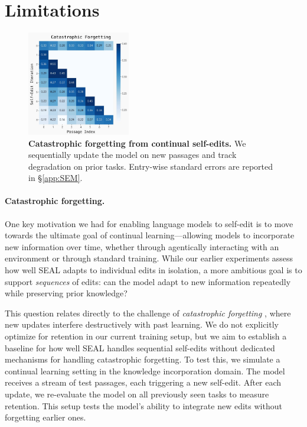 \documentclass{article}
\newcommand{\methodacronym}{SEAL\xspace}
\begin{document}
\section{Limitations}
\begin{figure}
    \vspace{-15pt}
    \centering
    \includegraphics[width=0.4\textwidth]{figures/catastrophic.pdf}
    \vspace{-10pt}
    \caption{\textbf{Catastrophic forgetting from continual self-edits.} We sequentially update the model on new passages and track degradation on prior tasks. Entry-wise standard errors are reported in \S\ref{app:SEM}.}
    \label{fig:forgetting_analysis}
    \vspace{-25pt}
\end{figure}

\paragraph{Catastrophic forgetting.} One key motivation we had for enabling language models to self-edit is to move towards the ultimate goal of continual learning---allowing models to incorporate new information over time, whether through agentically interacting with an environment or through standard training. While our earlier experiments assess how well \methodacronym adapts to individual edits in isolation, a more ambitious goal is to support \textit{sequences} of edits: can the model adapt to new information repeatedly while preserving prior knowledge? 

This question relates directly to the challenge of \textit{catastrophic forgetting} \citep{mccloskey1989catastrophicinterference, goodfellow2015catastrophicforgetting}, where new updates interfere destructively with past learning. We do not explicitly optimize for retention in our current training setup, but we aim to establish a baseline for how well \methodacronym handles sequential self-edits without dedicated mechanisms for handling catastrophic forgetting. To test this, we simulate a continual learning setting in the knowledge incorporation domain. The model receives a stream of test passages, each triggering a new self-edit. After each update, we re-evaluate the model on all previously seen tasks to measure retention. This setup tests the model's ability to integrate new edits without forgetting earlier ones.
\end{document}
